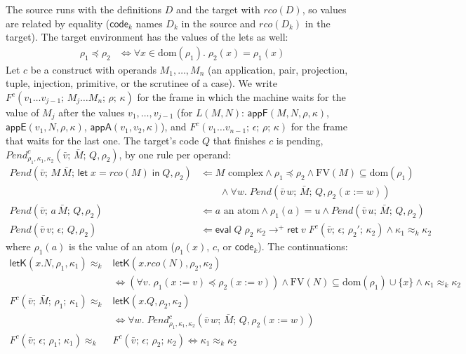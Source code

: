\documentclass[10pt]{article}
\theoremstyle{acmplain}
\newcommand{\key}[1]{\mathsf{#1}}
\newcommand{\pass}[1]{\mathit{#1}}
\newcommand{\Let}{\key{let}\;}
\newcommand{\In}{\;\key{in}\;}
\newcommand{\FV}{\mathrm{FV}}
\newcommand{\ext}[3]{#1(#2{:=}#3)}
\newcommand{\ev}[3]{\key{eval}\;#1\;#2\;#3}
\newcommand{\rt}[2]{\key{ret}\;#1\;#2}
\newcommand{\codeV}[1]{\key{code}_{#1}}
\newcommand{\Kf}[2]{\key{#1}(#2)}
\newcommand{\lto}{\longrightarrow}
\newcommand{\approxk}{\approx_k}
\begin{document}
The source runs with the definitions $D$ and the target with
$\pass{rco}(D)$, so values are related by equality ($\codeV{k}$ names
$D_k$ in the source and $\pass{rco}(D_k)$ in the target). The target
environment has the values of the lets as well:
\begin{align*}
  \rho_1 \preceq \rho_2 &\iff \forall x \in \mathrm{dom}(\rho_1).\; \rho_2(x) = \rho_1(x)
\end{align*}
Let $c$ be a construct with operands $M_1, \ldots, M_n$ (an application,
pair, projection, tuple, injection, primitive, or the scrutinee of a
case). We write $F^c(v_1 \ldots v_{j-1};\, M_j \ldots M_n;\, \rho;\, \kappa)$
for the frame in which the machine waits for the value of $M_j$ after the values
$v_1, \ldots, v_{j-1}$ (for $L(M, N)$: $\Kf{appF}{M, N, \rho, \kappa}$,
$\Kf{appE}{v_1, N, \rho, \kappa}$, $\Kf{appA}{v_1, v_2, \kappa}$), and
$F^c(v_1 \ldots v_{n-1};\, \epsilon;\, \rho;\, \kappa)$ for the frame
that waits for the last one. The target's code $Q$ that finishes $c$ is
pending, $\mathit{Pend}^c_{\rho_1, \kappa_1, \kappa_2}(\bar{v};\, \bar{M};\, Q, \rho_2)$,
by one rule per operand:
\begin{align*}
  \mathit{Pend}(\bar{v};\, M\,\bar{M};\, \Let x = \pass{rco}(M) \In Q, \rho_2)
    &\Leftarrow M \text{ complex} \land \rho_1 \preceq \rho_2 \land \FV(M) \subseteq \mathrm{dom}(\rho_1) \\
    &\qquad \land \forall w.\; \mathit{Pend}(\bar{v}\, w;\, \bar{M};\, Q, \ext{\rho_2}{x}{w}) \\
  \mathit{Pend}(\bar{v};\, a\,\bar{M};\, Q, \rho_2)
    &\Leftarrow a \text{ an atom} \land \rho_1(a) = u \land \mathit{Pend}(\bar{v}\, u;\, \bar{M};\, Q, \rho_2) \\
  \mathit{Pend}(\bar{v}\, v;\, \epsilon;\, Q, \rho_2)
    &\Leftarrow \ev{Q}{\rho_2}{\kappa_2} \lto^+ \rt{v}{F^c(\bar{v};\, \epsilon;\, \rho_2';\, \kappa_2)}
    \land \kappa_1 \approxk \kappa_2
\end{align*}
where $\rho_1(a)$ is the value of an atom ($\rho_1(x)$, $c$, or $\codeV{k}$).
The continuations:
\begin{align*}
  \Kf{letK}{x.N, \rho_1, \kappa_1} \approxk {}& \Kf{letK}{x.\pass{rco}(N), \rho_2, \kappa_2} \\
    &\iff (\forall v.\; \ext{\rho_1}{x}{v} \preceq \ext{\rho_2}{x}{v}) \land
      \FV(N) \subseteq \mathrm{dom}(\rho_1) \cup \{x\} \land \kappa_1 \approxk \kappa_2 \\
  F^c(\bar{v};\, \bar{M};\, \rho_1;\, \kappa_1) \approxk {}& \Kf{letK}{x.Q, \rho_2, \kappa_2} \\
    &\iff \forall w.\; \mathit{Pend}^c_{\rho_1, \kappa_1, \kappa_2}(\bar{v}\, w;\, \bar{M};\, Q, \ext{\rho_2}{x}{w}) \\
  F^c(\bar{v};\, \epsilon;\, \rho_1;\, \kappa_1) \approxk {}& F^c(\bar{v};\, \epsilon;\, \rho_2;\, \kappa_2)
    \iff \kappa_1 \approxk \kappa_2
\end{align*}
\end{document}
